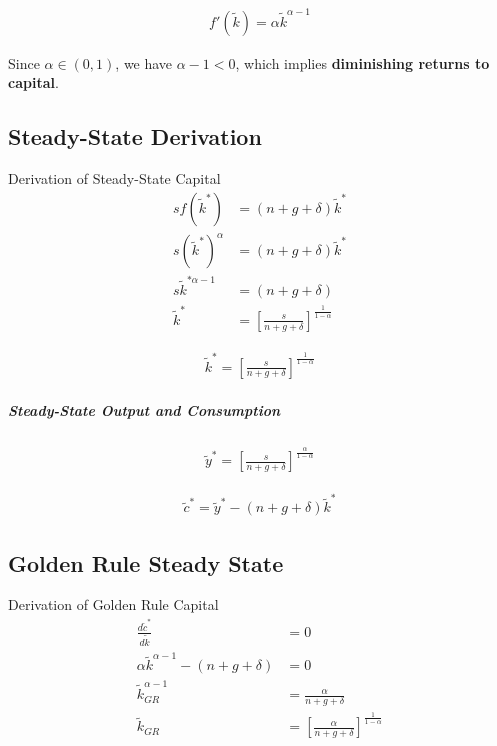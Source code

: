 \documentclass[a4paper,11pt]{article}
\newcommand{\ktilde}{\tilde{k}}
\newcommand{\ytilde}{\tilde{y}}
\newcommand{\ctilde}{\tilde{c}}
\begin{document}
\begin{resultbox}
\begin{align*}
\boxed{f'(\ktilde) = \alpha \ktilde^{\alpha-1}}
\tag{CD-MPK}
\end{align*}
\end{resultbox}

Since $\alpha \in (0,1)$, we have $\alpha - 1 < 0$, which implies \textbf{diminishing returns to capital}.

\subsection*{Steady-State Derivation}

\begin{derivationbox}{Derivation of Steady-State Capital}
\begin{align}
s f(\ktilde^*) &= (n+g+\delta)\ktilde^* \\
s(\ktilde^*)^\alpha &= (n+g+\delta)\ktilde^* \\
s\ktilde^{*\alpha-1} &= (n+g+\delta) \\
\ktilde^* &= \left[\frac{s}{n+g+\delta}\right]^{\frac{1}{1-\alpha}}
\end{align}
\end{derivationbox}

\begin{resultbox}
\begin{align*}
\boxed{\ktilde^* = \left[\frac{s}{n + g + \delta}\right]^{\frac{1}{1-\alpha}}}
\tag{CD-SS-k}
\end{align*}
\end{resultbox}

\subparagraph*{Steady-State Output and Consumption}
\begin{align*}
\ytilde^* = \left[\frac{s}{n + g + \delta}\right]^{\frac{\alpha}{1-\alpha}}
\tag{CD-SS-y}
\end{align*}

\begin{align*}
\ctilde^* = \ytilde^* - (n + g + \delta)\ktilde^*
\tag{CD-SS-c}
\end{align*}

\subsection*{Golden Rule Steady State}

\begin{derivationbox}{Derivation of Golden Rule Capital}
\begin{align}
\frac{d\ctilde^*}{d\ktilde} &= 0 \\
\alpha \ktilde^{\alpha-1} - (n+g+\delta) &= 0 \\
\ktilde_{GR}^{\alpha-1} &= \frac{\alpha}{n+g+\delta} \\
\ktilde_{GR} &= \left[\frac{\alpha}{n+g+\delta}\right]^{\frac{1}{1-\alpha}}
\end{align}
\end{derivationbox}
\end{document}

